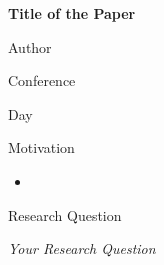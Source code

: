 \documentclass[aspectratio=169]{beamer}
\begin{document}


\begin{frame}
  \centering
  \vspace{1.5em}
  {\Large\textbf{\color{NavyBlue}Title of the Paper}}

  \vspace{2.6em}
  {Author\par}
  \vspace{0.6em}
  {Conference\par}
  \vspace{0.6em}
  {Day\par}
\end{frame}



\begin{frame}{Motivation}
  \centering

\begin{itemize}
    \item
\end{itemize}


\end{frame}


\begin{frame}{Research Question}


\begin{tcolorbox}[width=\textwidth, boxrule=1pt, arc=2mm,
                  left=4mm,right=4mm,top=3.5mm,bottom=3.5mm,
                  colframe=NavyBlue, colback=LightBlue]
\small\centering
\textit{Your Research Question}
\end{tcolorbox}

\vspace{2mm}



\end{frame}
\end{document}
